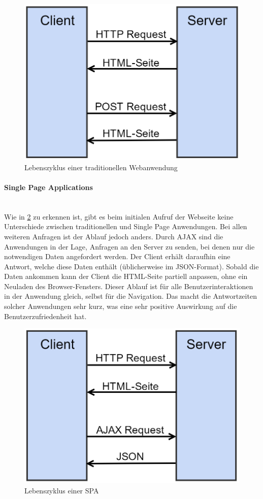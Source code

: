 \begin{figure}[ht!]
	\centering
	\includegraphics[width=0.5\linewidth]{bilder/kap2/trad_web}
	\caption{Lebenszyklus einer traditionellen Webanwendung}
	\label{fig:traditional-web}
\end{figure}

\paragraph{Single Page Applications}$\;$ \\
Wie in \cref{fig:spa} zu erkennen ist, gibt es beim initialen Aufruf der Webseite keine Unterschiede zwischen traditionellen und Single Page Anwendungen. Bei allen weiteren Anfragen ist der Ablauf jedoch anders. Durch AJAX sind die Anwendungen in der Lage, Anfragen an den Server zu senden, bei denen nur die notwendigen Daten angefordert werden. Der Client erhält daraufhin eine Antwort, welche diese Daten enthält (üblicherweise im \acs{JSON}-Format). Sobald die Daten ankommen kann der Client die HTML-Seite partiell anpassen, ohne ein Neuladen des Browser-Fensters. Dieser Ablauf ist für alle Benutzerinteraktionen in der Anwendung gleich, selbst für die Navigation. Das macht die Antwortzeiten solcher Anwendungen sehr kurz, was eine sehr positive Auswirkung auf die Benutzerzufriedenheit hat.

\begin{figure}[ht!]
	\centering
	\includegraphics[width=0.5\linewidth]{bilder/kap2/spa}
	\caption{Lebenszyklus einer \acs{SPA}}
	\label{fig:spa}
\end{figure}






